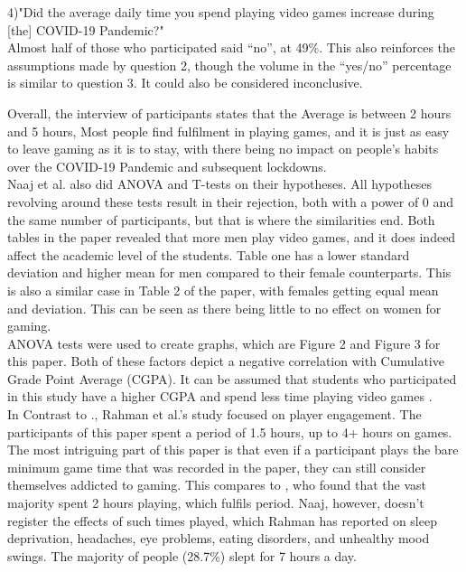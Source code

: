 \documentclass[conference]{IEEEtran}
\begin{document}
4)"Did the average daily time you spend playing video games increase during [the] COVID-19 Pandemic?"\\

Almost half of those who participated said “no”, at 49\%. This also reinforces the assumptions made by question 2, though the volume in the “yes/no” percentage is similar to question 3. It could also be considered inconclusive.

Overall, the interview of participants states that the Average is between 2 hours and 5 hours, Most people find fulfilment in playing games, and it is just as easy to leave gaming as it is to stay, with there being no impact on people’s habits over the COVID-19 Pandemic and subsequent lockdowns.\\

Naaj et al. also did ANOVA and T-tests on their hypotheses. All hypotheses revolving around these tests result in their rejection, both with a power of 0 and the same number of participants, but that is where the similarities end. Both tables in the paper revealed that more men play video games, and it does indeed affect the academic level of the students. Table one has a lower standard deviation and higher mean for men compared to their female counterparts. This is also a similar case in Table 2 of the paper, with females getting equal mean and deviation. This can be seen as there being little to no effect on women for gaming.\\

ANOVA tests were used to create graphs, which are Figure 2 and Figure 3 for this paper. Both of these factors depict a negative correlation with Cumulative Grade Point Average (CGPA). It can be assumed that students who participated in this study have a higher CGPA and spend less time playing video games \cite{Naaj2021}.\\

In Contrast to \cite{Naaj2021}., Rahman et al.’s \cite{Rahman2021} study focused on player engagement. The participants of this paper spent a period of 1.5 hours, up to 4+ hours on games. The most intriguing part of this paper is that even if a participant plays the bare minimum game time that was recorded in the paper, they can still consider themselves addicted to gaming. This compares to \cite{Naaj2021}, who found that the vast majority spent 2 hours playing, which fulfils \cite{Rahman2021} period. Naaj, however, doesn’t register the effects of such times played, which Rahman has reported on sleep deprivation, headaches, eye problems, eating disorders, and unhealthy mood swings. The majority of people (28.7\%) slept for 7 hours a day.\\
\end{document}
